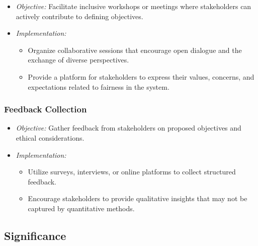 \documentclass[12pt,a4paper,openright,twoside]{book}
\begin{document}
\begin{itemize}

    \item \emph{Objective:} Facilitate inclusive workshops or meetings where stakeholders can actively contribute to defining objectives.

    \item \emph{Implementation:}

    \begin{itemize}

        \item Organize collaborative sessions that encourage open dialogue and the exchange of diverse perspectives.

        \item Provide a platform for stakeholders to express their values, concerns, and expectations related to fairness in the system.

    \end{itemize}

\end{itemize}

\subsubsection{Feedback Collection}

\begin{itemize}

    \item \emph{Objective:} Gather feedback from stakeholders on proposed objectives and ethical considerations.

    \item \emph{Implementation:}

    \begin{itemize}

        \item Utilize surveys, interviews, or online platforms to collect structured feedback.

        \item Encourage stakeholders to provide qualitative insights that may not be captured by quantitative methods.

    \end{itemize}

\end{itemize}

\subsection{Significance}
\end{document}
